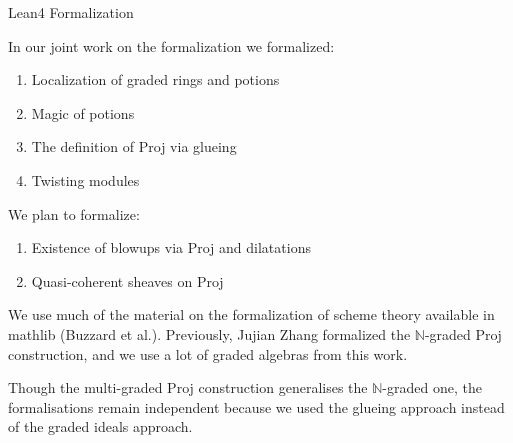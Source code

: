 \documentclass[9pt]{beamer}
\begin{document}
\begin{frame}{Lean4 Formalization}

In our joint work on the formalization we formalized: 
\begin{enumerate}
\item Localization of graded rings and potions

\item Magic of potions 

\item The definition of Proj via glueing 

\item Twisting modules
\end{enumerate}
We plan to formalize:

\begin{enumerate} \item Existence of blowups via Proj and dilatations 
\item Quasi-coherent sheaves on Proj
\end{enumerate}



We use much of the material on the formalization of scheme theory available in mathlib (Buzzard et al.).
Previously, Jujian Zhang formalized the $\mathbb{N}$-graded $\mathrm{Proj}$ construction, and we use a lot of graded algebras from this work. 



 Though the multi-graded Proj construction generalises the $\mathbb{N}$-graded one, the formalisations remain independent because we used the glueing approach instead of the graded ideals approach. 


\end{frame}
\end{document}
